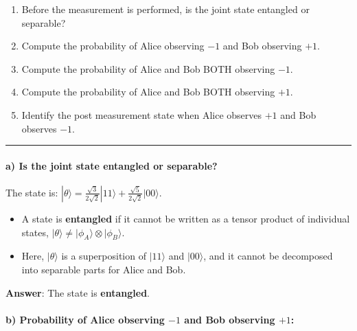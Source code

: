 \documentclass[11pt]{article}
\providecommand{\tightlist}{%
      \setlength{\itemsep}{0pt}\setlength{\parskip}{0pt}}
\begin{document}
\begin{enumerate}
\def\labelenumi{\alph{enumi})}
\item
  Before the measurement is performed, is the joint state entangled or
  separable?
\item
  Compute the probability of Alice observing \(-1\) and Bob observing
  \(+1\).
\item
  Compute the probability of Alice and Bob BOTH observing \(−1\).
\item
  Compute the probability of Alice and Bob BOTH observing \(+1\).
\item
  Identify the post measurement state when Alice observes \(+1\) and Bob
  observes \(−1\).
\end{enumerate}

    \begin{center}\rule{0.5\linewidth}{0.5pt}\end{center}

\paragraph{\texorpdfstring{\textbf{a) Is the joint state entangled or
separable?}}{a) Is the joint state entangled or separable?}}\label{a-is-the-joint-state-entangled-or-separable}

The state is:
\(|\theta\rangle = \frac{\sqrt{3}}{2\sqrt{2}} |11\rangle + \frac{\sqrt{5}}{2\sqrt{2}} |00\rangle.\)

\begin{itemize}
\tightlist
\item
  A state is \textbf{entangled} if it cannot be written as a tensor
  product of individual states,
  \(|\theta\rangle \neq |\phi_A\rangle \otimes |\phi_B\rangle\).
\item
  Here, \(|\theta\rangle\) is a superposition of \(|11\rangle\) and
  \(|00\rangle\), and it cannot be decomposed into separable parts for
  Alice and Bob.
\end{itemize}

\textbf{Answer}: The state is \textbf{entangled}.

\paragraph{\texorpdfstring{\textbf{b) Probability of Alice observing
\(-1\) and Bob observing
\(+1\):}}{b) Probability of Alice observing -1 and Bob observing +1:}}\label{b-probability-of-alice-observing--1-and-bob-observing-1}
\end{document}

